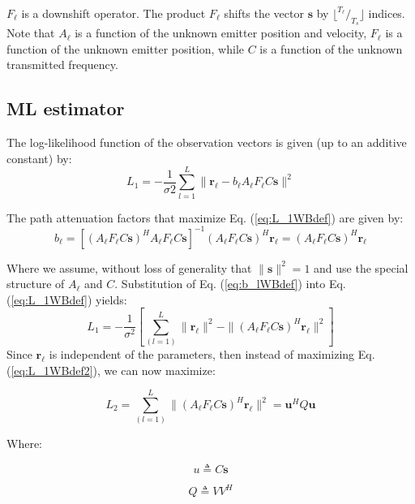 $F_\ell$ is a downshift operator. The product $F_\ell$ shifts the vector $\mathbf{s}$ by $\lfloor ^{T_\ell}/_{T_s} \rfloor$ indices.
Note that $A_\ell$ is a function of the unknown emitter position and velocity, $F_\ell$ is a function of the unknown emitter position, while $C$ is a function of the unknown transmitted frequency.
 
\subsection{ML estimator}
The log-likelihood function of the observation vectors is given (up to an additive constant) by:
\begin{equation}
\label{eq:L_1WBdef}
L_1 = -\frac{1}{\sigma{2}} \sum_{l=1}^{L} \|\mathbf{r_\ell} - b_\ell A_\ell F_\ell C \mathbf{s}\|^2                                                             
\end{equation}

The path attenuation factors that maximize Eq. (\ref{eq:L_1WBdef}) are given by:
\begin{equation}
\label{eq:b_lWBdef}
b_\ell = [(A_\ell F_\ell C \mathbf{s})^{H} A_\ell F_\ell C \mathbf{s}]^{-1}(A_\ell F_\ell C \mathbf{s})^{H} \mathbf{r_\ell} = (A_\ell F_\ell C \mathbf{s})^{H} \mathbf{r_\ell}
\end{equation}

Where we assume, without loss of generality that $\|\mathbf{s}\|^2=1$ and use the special structure of $A_\ell$ and $C$.
Substitution of Eq. (\ref{eq:b_lWBdef}) into Eq. (\ref{eq:L_1WBdef}) yields:
\begin{equation}
\label{eq:L_1WBdef2}
L_1=-\frac{1}{\sigma^2} [\sum_{(l=1)}^{L}\|\mathbf{r_\ell}\|^2 -\|(A_\ell F_\ell C \mathbf{s})^H \mathbf{r_\ell}\|^2]
\end{equation}
Since $\mathbf{r_\ell}$ is independent of the parameters, then instead of maximizing Eq. (\ref{eq:L_1WBdef2}), we can now maximize:

\begin{equation}
\label{eq:L_2WBdef}
L_2=\sum_{(l=1)}^{L}\|(A_\ell F_\ell C \mathbf{s})^H \mathbf{r_\ell}\|^2 = \mathbf{u}^HQ\mathbf{u}
\end{equation}

Where:

\begin{equation}
u \triangleq C \mathbf{s}
\end{equation}

\begin{equation}
Q \triangleq V V^H
\end{equation}


